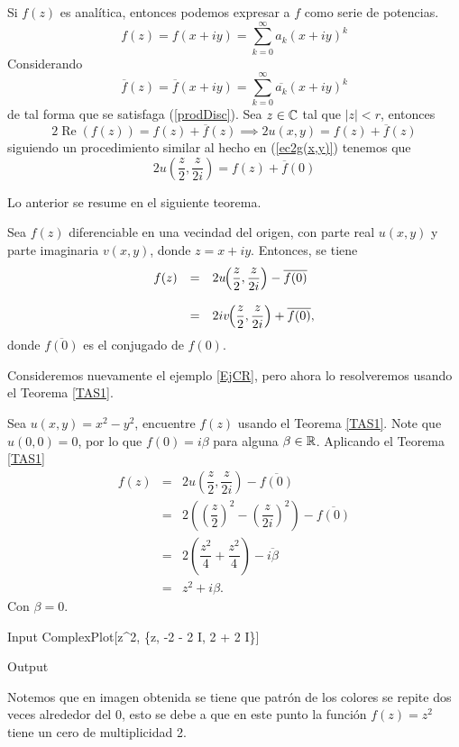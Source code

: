 Si $f(z)$ es analítica, entonces podemos expresar a $f$ como serie de potencias. 
$$f(z)=f(x+iy)=\sum_{k=0}^{\infty}a_k(x+iy)^k$$
Considerando $$\overline{f}(z)=\overline{f}(x+iy)=\sum_{k=0}^{\infty}\overline{a_k}(x+iy)^k$$ de tal forma que se satisfaga (\ref{prodDisc}). Sea $z\in \mathbb{C}$ tal que $|z|<r$, entonces $$2\operatorname{Re }(f(z))=f(z)+\overline{f}(z)\implies 2u(x,y)=f(z)+\overline{f}(z)$$ siguiendo un procedimiento similar al hecho en (\ref{ec2g(x,y)}) tenemos que
\begin{equation}\label{ecAS1}
	2u\left(\dfrac{z}{2},\dfrac{z}{2i}\right)=f(z)+\overline{f}(0)
\end{equation}

Lo anterior se resume en el siguiente teorema.

\begin{teor}\label{TAS1}
	Sea $f(z)$ diferenciable en una vecindad del origen, con parte real $u(x, y)$ y parte imaginaria $v(x, y)$, donde 
	$z = x + iy$. Entonces, se tiene
	\[
		\begin{array}{ccl}
			f(z)&=&2u\hspace{-0.1cm}\left(\dfrac{z}{2},\dfrac{z}{2i}\right)-\overline{f(0)}\\\\
			&=&2iv\hspace{-0.1cm}\left(\dfrac{z}{2},\dfrac{z}{2i}\right)+\overline{f(0)},
		\end{array}
	\]
	donde $\overline{f(0)}$ es el conjugado de $f(0)$.
\end{teor}
Consideremos nuevamente el ejemplo \ref{EjCR}, pero ahora lo resolveremos usando el Teorema \ref{TAS1}.
\begin{Ejem}	
	Sea $u(x,y)=x^2-y^2$, encuentre  $f(z)$ usando el Teorema \ref{TAS1}.
	\solu
	\noindent Note que $u(0, 0) = 0$, por lo que $f(0) = i\beta$ para alguna $\beta\in\mathbb{R}$. Aplicando el Teorema \ref{TAS1}
	\[
		\begin{array}{ccl}
			f(z)&=&2u\left(\dfrac{z}{2},\dfrac{z}{2i}\right)-\overline{f(0)}\\
			&=&2\left(\left(\dfrac{z}{2}\right)^2-\left(\dfrac{z}{2i}\right)^2\right)-\overline{f(0)}\\
			&=&2\left(\dfrac{z^2}{4}+\dfrac{z^2}{4}\right)-\overline{i\beta}\\
			&=&z^2+i\beta.
		\end{array}
	\]
	Con  $\beta=0$. 
	\begin{mmaCell}{Input}
		ComplexPlot[z^2, \{z, -2 - 2 I, 2 + 2 I\}]
	\end{mmaCell}
	
	\begin{mmaCell}[moregraphics={moreig={scale=.25}}]{Output}
	\end{mmaCell}
 Notemos que en imagen obtenida se tiene que patrón de los colores se repite dos veces alrededor del $0$, esto se debe a que en este punto la función $f(z)=z^2$ tiene un cero de multiplicidad 2.\endproof
\end{Ejem}

